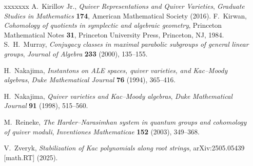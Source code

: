 \documentclass[12pt]{amsart}
\theoremstyle{plain}
\theoremstyle{definition}
\theoremstyle{remark}
\begin{document}
\begin{thebibliography}{xxxxxxx}
A.~Kirillov Jr., {\it Quiver Representations and Quiver Varieties},
{\it Graduate Studies in Mathematics} \textbf{174}, American Mathematical Society (2016).
F.~Kirwan, {\it Cohomology of quotients in symplectic and algebraic geometry},
Princeton Mathematical Notes {\bf 31}, Princeton University Press, Princeton, NJ, 1984.
S.~H.~Murray, {\it Conjugacy classes in maximal parabolic subgroups of general linear groups},
{\it Journal of Algebra} \textbf{233} (2000), 135--155.

H.~Nakajima, {\it Instantons on ALE spaces, quiver varieties, and Kac--Moody algebras},
{\it Duke Mathematical Journal} \textbf{76} (1994), 365--416.

H.~Nakajima, {\it Quiver varieties and Kac--Moody algebras},
{\it Duke Mathematical Journal} \textbf{91} (1998), 515--560.

M.~Reineke, {\it The Harder--Narasimhan system in quantum groups and cohomology of quiver moduli},
{\it Inventiones Mathematicae} \textbf{152} (2003), 349--368.

V.~Zveryk, {\it Stabilization of Kac polynomials along root strings},
arXiv:2505.05439 [math.RT] (2025).
\end{thebibliography}
\end{document}
